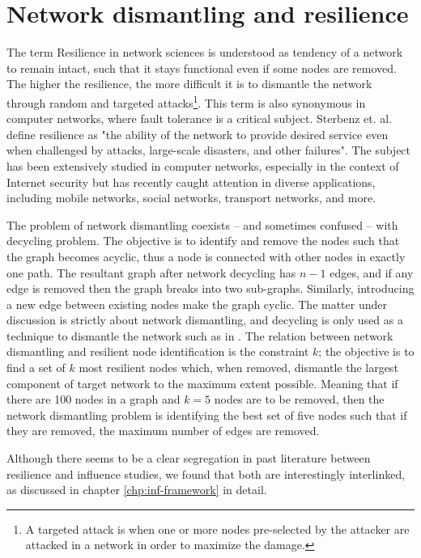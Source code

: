 	\section{Network dismantling and resilience}
	\label{sec:domain-resilience}
	The term Resilience in network sciences is understood as tendency of a network to remain intact, such that it stays functional even if some nodes are removed. The higher the resilience, the more difficult it is to dismantle the network through random and targeted attacks\footnote{A targeted attack is when one or more nodes pre-selected by the attacker are attacked in a network in order to maximize the damage.}. This term is also synonymous in computer networks, where fault tolerance is a critical subject. Sterbenz et. al. \cite{sterbenz2011} define resilience as "the ability of the network to provide desired service even when challenged by attacks, large-scale disasters, and other failures". The subject has been extensively studied in computer networks, especially in the context of Internet security but has recently caught attention in diverse applications, including mobile networks, social networks, transport networks, and more. 
	
	The problem of network dismantling coexists -- and sometimes confused -- with decycling problem. The objective is to identify and remove the nodes such that the graph becomes acyclic, thus a node is connected with other nodes in exactly one path. The resultant graph after network decycling has $n-1$ edges, and if any edge is removed then the graph breaks into two sub-graphs. Similarly, introducing a new edge between existing nodes make the graph cyclic. The matter under discussion is strictly about network dismantling, and decycling is only used as a technique to dismantle the network such as in \cite{braunstein2016}. The relation between network dismantling and resilient node identification is the constraint $k$; the objective is to find a set of $k$ most resilient nodes which, when removed, dismantle the largest component of target network to the maximum extent possible. Meaning that if there are 100 nodes in a graph and $k=5$ nodes are to be removed, then the network dismantling problem is identifying the best set of five nodes such that if they are removed, the maximum number of edges are removed.
	
	Although there seems to be a clear segregation in past literature between resilience and influence studies, we found that both are interestingly interlinked, as discussed in chapter \ref{chp:inf-framework} in detail. \\


